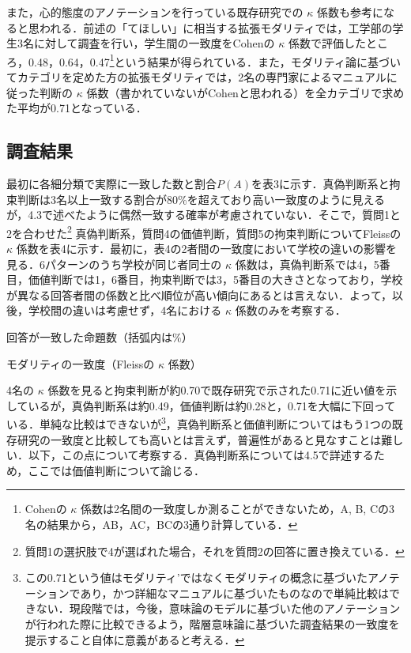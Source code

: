 \documentclass[japanese]{jnlp_1.4}
\begin{document}
また，心的態度のアノテーションを行っている既存研究での $\kappa$ 係数も参考になると思われる．前述の「てほしい」に相当する拡張モダリティ\cite{Article_01}では，工学部の学生3名に対して調査を行い，学生間の一致度をCohenの $\kappa$ 係数で評価したところ，0.48，0.64，0.47\footnote{Cohenの $\kappa$ 係数は2名間の一致度しか測ることができないため，A, B, Cの3名の結果から，AB，AC，BCの3通り計算している．}という結果が得られている．また，モダリティ論に基づいてカテゴリを定めた方の拡張モダリティ\cite{Inproc_04}では，2名の専門家によるマニュアルに従った判断の $\kappa$ 係数（書かれていないがCohenと思われる）を全カテゴリで求めた平均が0.71となっている．



\subsection{調査結果}

最初に各細分類で実際に一致した数と割合{$P(A)$}を表3に示す．真偽判断系と拘束判断は3名以上一致する割合が80\%を超えており高い一致度のように見えるが，4.3で述べたように偶然一致する確率が考慮されていない．そこで，質問1と2を合わせた\footnote{質問1の選択肢で4が選ばれた場合，それを質問2の回答に置き換えている．} 真偽判断系，質問4の価値判断，質問5の拘束判断についてFleissの $\kappa$ 係数\cite{Book_15}を表4に示す．最初に，表4の2者間の一致度において学校の違いの影響を見る．6パターンのうち学校が同じ者同士の $\kappa$ 係数は，真偽判断系では4，5番目，価値判断では1，6番目，拘束判断では3，5番目の大きさとなっており，学校が異なる回答者間の係数と比べ順位が高い傾向にあるとは言えない．よって，以後，学校間の違いは考慮せず，4名における $\kappa$ 係数のみを考察する．

\begin{table}[t]
\begin{minipage}[t]{.5\textwidth}
\caption{回答が一致した命題数（括弧内は\%）}

  \end{minipage}
  
  \hfill
  
  \begin{minipage}[t]{.45\textwidth}
\caption{モダリティの一致度（Fleissの $\kappa$ 係数）}

  \end{minipage}
\end{table}

4名の $\kappa$ 係数を見ると拘束判断が約0.70で既存研究\cite{Inproc_04}で示された0.71に近い値を示しているが，真偽判断系は約0.49，価値判断は約0.28と，0.71を大幅に下回っている．単純な比較はできないが\footnote{この0.71という値はモダリティ’ではなくモダリティの概念に基づいたアノテーションであり，かつ詳細なマニュアルに基づいたものなので単純比較はできない．現段階では，今後，意味論のモデルに基づいた他のアノテーションが行われた際に比較できるよう，階層意味論に基づいた調査結果の一致度を提示すること自体に意義があると考える．}，真偽判断系と価値判断についてはもう1つの既存研究\cite{Article_01}の一致度と比較しても高いとは言えず，普遍性があると見なすことは難しい．以下，この点について考察する．真偽判断系については4.5で詳述するため，ここでは価値判断について論じる．
\end{document}
